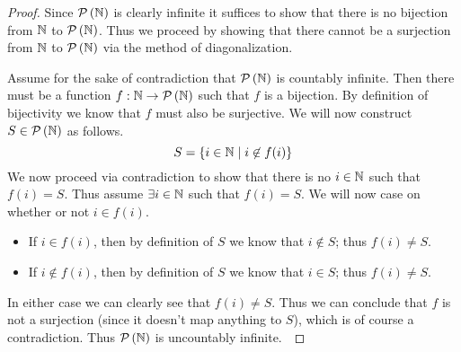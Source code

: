         \begin{proof}
            Since $\mathcal{P}\left(\mathbb{N}\right)$ is clearly infinite it suffices to show that there is
            no bijection from $\mathbb{N}$ to $\mathcal{P}\left(\mathbb{N}\right)$. Thus we proceed by showing
            that there cannot be a surjection from $\mathbb{N}$ to $\mathcal{P}\left(\mathbb{N}\right)$ via the
            method of diagonalization.

            Assume for the sake of contradiction that $\mathcal{P}\left(\mathbb{N}\right)$ is countably infinite.
            Then there must be a function $f : \mathbb{N} \rightarrow \mathcal{P}\left(\mathbb{N}\right)$ such that
            $f$ is a bijection. By definition of bijectivity we know that $f$ must also be surjective.
            We will now construct $S \in \mathcal{P}\left(\mathbb{N}\right)$ as follows.
            \[
                S = \left\{i \in \mathbb{N} \mid i \not\in f(i)\right\}
            \]
            We now proceed via contradiction to show that there is no $i \in \mathbb{N}$ such
            that $f(i) = S$.
            Thus assume $\exists i \in \mathbb{N}$ such that $f(i) = S$. We will now case on whether
            or not $i \in f(i)$.
            \begin{itemize}
                \item
                    If $i \in f(i)$, then by definition of $S$ we know that $i \not\in S$; thus $f(i) \neq S$.
                \item
                    If $i \not\in f(i)$, then by definition of $S$ we know that $i \in S$; thus $f(i) \neq S$.
            \end{itemize}
            In either case we can clearly see that $f(i) \neq S$. Thus we can conclude that
            $f$ is not a surjection (since it doesn't map anything to $S$), which is of course
            a contradiction. Thus $\mathcal{P}\left(\mathbb{N}\right)$ is uncountably infinite.~\QED



\end{proof}
